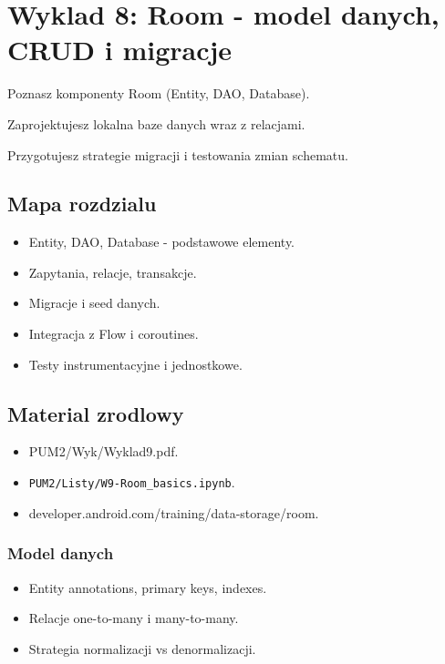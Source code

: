\chapter{Wyklad 8: Room - model danych, CRUD i migracje}

\begin{learningobjectives}
  \item Poznasz komponenty Room (Entity, DAO, Database).
  \item Zaprojektujesz lokalna baze danych wraz z relacjami.
  \item Przygotujesz strategie migracji i testowania zmian schematu.
\end{learningobjectives}

\section{Mapa rozdzialu}
\begin{itemize}
  \item Entity, DAO, Database - podstawowe elementy.
  \item Zapytania, relacje, transakcje.
  \item Migracje i seed danych.
  \item Integracja z Flow i coroutines.
  \item Testy instrumentacyjne i jednostkowe.
\end{itemize}

\section{Material zrodlowy}
\begin{itemize}
  \item PUM2/Wyk/Wyklad9.pdf.
  \item \texttt{PUM2/Listy/W9-Room\_basics.ipynb}.
  \item developer.android.com/training/data-storage/room.
\end{itemize}

\subsection{Model danych}
\begin{itemize}
  \item Entity annotations, primary keys, indexes.
  \item Relacje one-to-many i many-to-many.
  \item Strategia normalizacji vs denormalizacji.
\end{itemize}

